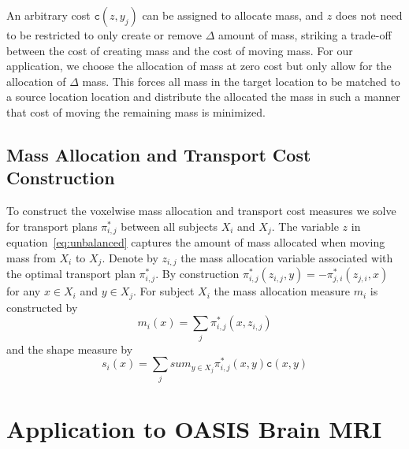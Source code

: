 \documentclass{llncs}
\newcommand{\cost}[0]{\mathtt{c}}
\newcommand{\coupling}[0]{\pi}
\begin{document}
An arbitrary cost $\cost(z, y_j)$ can be assigned to allocate mass, and $z$
does not need to be restricted to only create or remove $\Delta$ amount of
mass, striking a trade-off between the cost of creating mass and the cost of
moving mass. For our application, we choose the allocation of mass at zero cost
but only allow for the allocation of $\Delta$ mass. This forces all mass in the
target location to be matched to a source location location and distribute the
allocated the mass in such a manner that cost of moving the remaining mass is
minimized.

\subsection{Mass Allocation and Transport Cost Construction}
\label{sec:mass}
To construct the voxelwise mass allocation and transport cost measures we solve
for transport plans $\coupling^*_{i,j}$ between all subjects $X_i$ and $X_j$.  
The variable $z$ in equation~\ref{eq:unbalanced} captures the amount of mass
allocated when moving mass from $X_i$ to $X_j$. Denote by $z_{i, j}$ the mass
allocation variable associated with the optimal transport plan
$\coupling^*_{i,j}$.  By construction $\coupling^*_{i,j}(z_{i,j}, y) =
-\coupling^*_{j,i}(z_{j,i}, x)$ for any $x \in X_i$ and $y \in X_j$.  For
subject $X_i$ the mass allocation measure $m_i$ is constructed by
\begin{equation}
  m_i(x) = \sum_j \coupling^*_{i,j}( x, z_{i, j} )
\end{equation}
and the shape measure by
\begin{equation}
  s_i(x) = \sum_j sum_{y \in X_j} \coupling^*_{i,j}( x, y ) \cost(x, y)
\end{equation}



\section{Application to OASIS Brain MRI}
\end{document}
